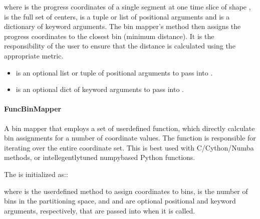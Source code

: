 \documentclass[letterpaper,10pt,english]{sphinxmanual}
\begin{document}
where  is the progress coordinates of a single segment at one time slice
of shape ,  is the full set of centers, 
is a tuple or list of positional arguments and  is a dictionary of
keyword arguments. The bin mapper’s  method then assigns the progress
coordinates to the closest bin (minimum distance). It is the responsibility of
the user to ensure that the distance is calculated using the appropriate
metric.
\begin{itemize}
\item {} 
 is an optional list or tuple of positional arguments to pass into
.

\item {} 
 is an optional dict of keyword arguments to pass into .

\end{itemize}


\paragraph{FuncBinMapper}
\label{\detokenize{users_guide/west/setup:funcbinmapper}}
A bin mapper that employs a set of user\sphinxhyphen{}defined function, which directly
calculate bin assignments for a number of coordinate values. The function is
responsible for iterating over the entire coordinate set. This is best used
with C/Cython/Numba methods, or intellegently\sphinxhyphen{}tuned numpy\sphinxhyphen{}based Python
functions.

The  is initialized as::

\begin{sphinxVerbatim}[commandchars=\\\{\}]
     
\end{sphinxVerbatim}

where  is the user\sphinxhyphen{}defined method to assign coordinates to bins,
 is the number of bins in the partitioning space, and  and
 are optional positional and keyword arguments, respectively, that
are passed into  when it is called.
\end{document}
